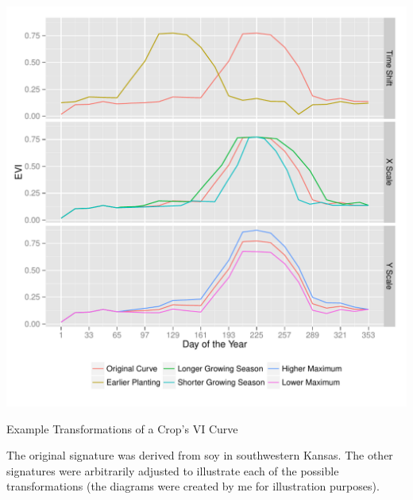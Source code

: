 \begin{ssfigure}
  \centering
  \includegraphics[width=\textwidth]{Graphics/transformations.pdf}
  \caption{Example Transformations of a Crop's VI Curve}
  \medskip
  \small
  The original signature was derived from soy in southwestern Kansas. The other signatures were arbitrarily adjusted to illustrate each of the possible transformations (the diagrams were created by me for illustration purposes).
  \label{fig:transformations}
\end{ssfigure}



